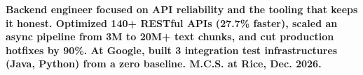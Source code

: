 \item\small{\textbf{Backend engineer focused on API reliability and the tooling that keeps it honest. Optimized \textbf{140+} RESTful APIs (\textbf{27.7\%} faster), scaled an async pipeline from 3M to \textbf{20M+} text chunks, and cut production hotfixes by \textbf{90\%}. At \textbf{Google}, built \textbf{3} integration test infrastructures (\textbf{Java}, \textbf{Python}) from a zero baseline. M.C.S. at Rice, Dec. 2026.}}%
